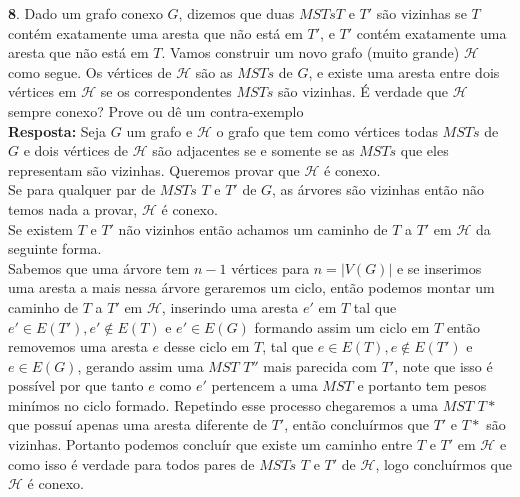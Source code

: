 
\noindent \textbf{8}. Dado um grafo conexo $G$, dizemos que duas $MSTs T$  e $T'$ são vizinhas se $T$ contém exatamente uma aresta que não está em $T'$, e $T'$ contém exatamente uma aresta que não está em $T$. Vamos construir um novo grafo (muito grande) $\mathcal{H}$ como segue. Os vértices de $\mathcal{H}$ são as $MSTs$ de $G$, e existe uma aresta entre dois vértices em $\mathcal{H}$ se os correspondentes $MSTs$ são vizinhas. É verdade que $\mathcal{H}$ sempre conexo? Prove ou dê um contra-exemplo
\\[6pt]
\noindent \textbf{Resposta:} Seja $G$ um grafo e $\mathcal{H}$ o grafo que tem como vértices todas $MSTs$ de $G$ e dois vértices de $\mathcal{H}$ são adjacentes se e somente se as $MSTs$ que eles representam são vizinhas. Queremos provar que $\mathcal{H}$ é conexo.
\\[6pt]
\noindent Se para qualquer par de $MSTs$ $T$ e $T'$ de $G$, as árvores são vizinhas então não temos nada a provar, $\mathcal{H}$ é conexo.
\\[6pt]
\noindent Se existem $T$ e $T'$ não vizinhos então achamos um caminho de $T$ a $T'$ em $\mathcal{H}$ da seguinte forma.
\\[6pt]
\noindent Sabemos que uma árvore tem $n-1$ vértices para $n = |V(G)|$ e se inserimos uma aresta a mais nessa árvore geraremos um ciclo, então podemos montar um caminho de $T$ a $T'$ em $\mathcal{H}$, inserindo uma aresta $e'$ em $T$ tal que $e' \in E(T'), e' \notin E(T)$ e $e' \in E(G)$ formando assim um ciclo em $T$ então removemos uma aresta $e$ desse ciclo em $T$, tal que $e \in E(T), e \notin E(T')$ e $e \in E(G)$, gerando assim uma $MST$ $T''$ mais parecida com $T'$, note que isso é possível por que tanto $e$ como $e'$ pertencem a uma $MST$ e portanto tem pesos minímos no ciclo formado. Repetindo esse processo chegaremos a uma $MST$ $T*$ que possuí apenas uma aresta diferente de $T'$, então concluírmos que $T'$ e $T*$ são vizinhas. Portanto podemos concluír que existe um caminho entre $T$ e $T'$ em $\mathcal{H}$ e como isso é verdade para todos pares de $MSTs$ $T$ e $T'$ de $\mathcal{H}$, logo concluírmos que $\mathcal{H}$ é conexo.